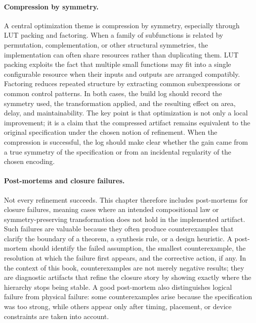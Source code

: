 \documentclass[11pt]{article}
\begin{document}
\paragraph{Compression by symmetry.}
A central optimization theme is compression by symmetry, especially through LUT packing and factoring. When a family of subfunctions is related by permutation, complementation, or other structural symmetries, the implementation can often share resources rather than duplicating them. LUT packing exploits the fact that multiple small functions may fit into a single configurable resource when their inputs and outputs are arranged compatibly. Factoring reduces repeated structure by extracting common subexpressions or common control patterns. In both cases, the build log should record the symmetry used, the transformation applied, and the resulting effect on area, delay, and maintainability. The key point is that optimization is not only a local improvement; it is a claim that the compressed artifact remains equivalent to the original specification under the chosen notion of refinement. When the compression is successful, the log should make clear whether the gain came from a true symmetry of the specification or from an incidental regularity of the chosen encoding.

\paragraph{Post-mortems and closure failures.}
Not every refinement succeeds. This chapter therefore includes post-mortems for closure failures, meaning cases where an intended compositional law or symmetry-preserving transformation does not hold in the implemented artifact. Such failures are valuable because they often produce counterexamples that clarify the boundary of a theorem, a synthesis rule, or a design heuristic. A post-mortem should identify the failed assumption, the smallest counterexample, the resolution at which the failure first appears, and the corrective action, if any. In the context of this book, counterexamples are not merely negative results; they are diagnostic artifacts that refine the closure story by showing exactly where the hierarchy stops being stable. A good post-mortem also distinguishes logical failure from physical failure: some counterexamples arise because the specification was too strong, while others appear only after timing, placement, or device constraints are taken into account.
\end{document}
